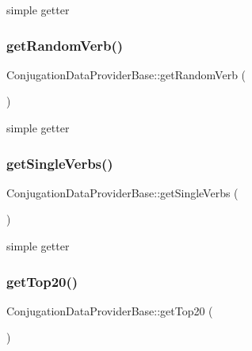simple getter \hypertarget{class_conjugation_data_provider_base_aa23d566d02578adb55592bba5a796fa8}{}\label{class_conjugation_data_provider_base_aa23d566d02578adb55592bba5a796fa8} 
\subsubsection{\texorpdfstring{get\+Random\+Verb()}{getRandomVerb()}}
{\footnotesize\ttfamily Conjugation\+Data\+Provider\+Base\+::get\+Random\+Verb (\begin{DoxyParamCaption}{ }\end{DoxyParamCaption})\hspace{0.3cm}{\ttfamily [abstract]}}

simple getter \hypertarget{class_conjugation_data_provider_base_a3a209dff42ff754afa7c81a8182266d7}{}\label{class_conjugation_data_provider_base_a3a209dff42ff754afa7c81a8182266d7} 
\subsubsection{\texorpdfstring{get\+Single\+Verbs()}{getSingleVerbs()}}
{\footnotesize\ttfamily Conjugation\+Data\+Provider\+Base\+::get\+Single\+Verbs (\begin{DoxyParamCaption}{ }\end{DoxyParamCaption})\hspace{0.3cm}{\ttfamily [abstract]}}

simple getter \hypertarget{class_conjugation_data_provider_base_aafcbd6631477f8f634d762b5ba5dc217}{}\label{class_conjugation_data_provider_base_aafcbd6631477f8f634d762b5ba5dc217} 
\subsubsection{\texorpdfstring{get\+Top20()}{getTop20()}}
{\footnotesize\ttfamily Conjugation\+Data\+Provider\+Base\+::get\+Top20 (\begin{DoxyParamCaption}{ }\end{DoxyParamCaption})\hspace{0.3cm}{\ttfamily [abstract]}}

